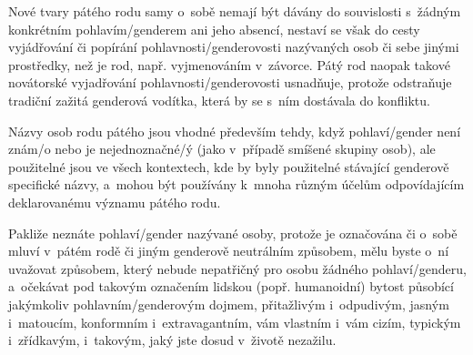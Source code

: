 \documentclass[10pt,draft]{article}
\begin{document}
Nové tvary pátého rodu samy o sobě nemají být dávány do souvislosti
s žádným konkrétním pohlavím/genderem ani jeho absencí,
nestaví se však do cesty vyjádřování či popírání pohlavnosti/genderovosti
nazývaných osob či sebe jinými prostředky, než je rod,
např. vyjmenováním v závorce. Pátý rod naopak takové novátorské vyjadřování
pohlavnosti/genderovosti usnadňuje, protože odstraňuje tradiční
zažitá genderová vodítka, která by se s ním dostávala do konfliktu.

Názvy osob rodu pátého jsou vhodné především tehdy,
když pohlaví/gender není znám/o nebo je nejednoznačné/ý
(jako v případě smíšené skupiny osob), ale použitelné jsou ve všech kontextech,
kde by byly použitelné stávající genderově specifické názvy,
a mohou být používány k mnoha různým účelům odpovídajícím deklarovanému
významu pátého rodu.

Pakliže neznáte pohlaví/gender nazývané osoby, protože je označována
či o sobě mluví v pátém rodě či jiným genderově neutrálním způsobem,
mělu byste o ní uvažovat způsobem, který nebude nepatřičný
pro osobu žádného pohlaví/genderu, a očekávat pod takovým označením lidskou
(popř. humanoidní) bytost působící jakýmkoliv pohlavním/genderovým dojmem,
přitažlivým i odpudivým,
jasným i matoucím, konformním i extravagantním,
vám vlastním i vám cizím, typickým i zřídkavým,
i takovým, jaký jste dosud v životě nezažilu.

\begin{comment}
Co chci sdělit:

X* 5R má být esteticky srovnatelný s rodem ž. a m.ž.
X* je pohlavně/genderově neutrální
X* je náhradou lomítkových tvarů a generického maskulina
X* poskytuje mluvnické prostředky, které nejsou a nemají být stereotypně spojeny se žádným konkrétním pohlavím/genderem
X* nemá vyvolávat dojem určitého pohlaví/genderu
X* odmítá sdělování p/r/g nazývaných osob mluvnickým rodem či přechylovací příponou
X* není-li p/g vyjádřen/o jinými prostředky, požaduje 5R pohl/gend. necitlivost; té napomáhají...
X* 5R je vhodný zejména tehdy, když p/g není znám/o nebo je nejednoznačný/é (např. ve smíšené skupině lidí)

Použití pátého rodu nebrání vyjádření ani popření pohlavnosti/genderovosti
nazývaných osob jinými prostředky, než je mluvnický rod,
jako např. vhodně zvolenými přídavnými jmény, ale není příliš vhodné
pro osoby, které jsou na svoje pohlaví/svůj gender obzvlášť hrdé
a chtějí ho co nejvíc předvádět ostatním.
\end{comment}
\end{document}
